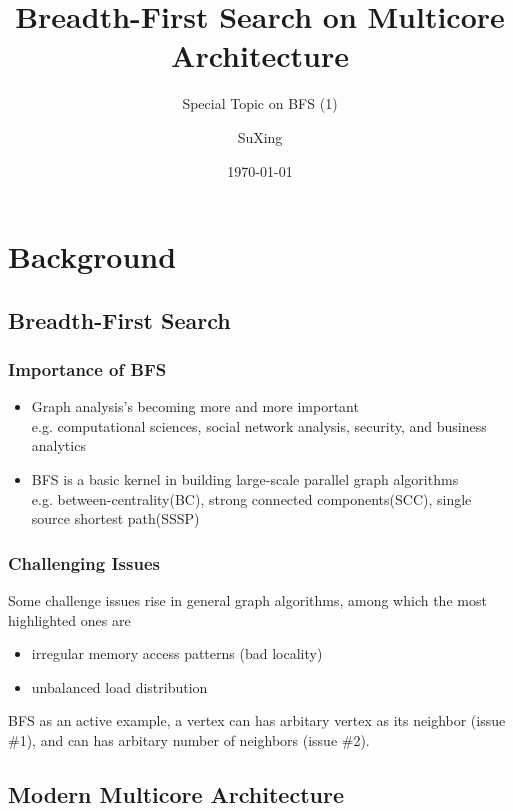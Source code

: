 \documentclass[]{beamer}
\title{Breadth-First Search on Multicore Architecture}
\subtitle{Special Topic on BFS (1)}
\author[SuXing~pysuxing@gmail.com]{SuXing}
\institute{TOW}
\date{\today}
\begin{document}
 
\setlength{\parindent}{0pt}

\frame{\titlepage}
\frame{\tableofcontents[hideallsubsections]}

\section{Background}
\frame{\tableofcontents[currentsection]}

\subsection{Breadth-First Search}

\begin{frame}
  \frametitle{Importance of BFS}
  \begin{itemize}
    \item Graph analysis's becoming more and more important\\
      e.g. computational sciences, social network analysis, security, and business analytics
    \item BFS is a basic kernel in building large-scale parallel graph algorithms\\
      e.g. between-centrality(BC), strong connected components(SCC), single source shortest path(SSSP)
  \end{itemize}
\end{frame}

\begin{frame}
  \frametitle{Challenging Issues}
  Some challenge issues rise in general graph algorithms, among which the most highlighted ones are
  \begin{itemize}
    \item irregular memory access patterns (bad locality)
    \item unbalanced load distribution
  \end{itemize}
  BFS as an active example, a vertex can has arbitary vertex as its neighbor (issue \#1), and can has
  arbitary number of neighbors (issue \#2).
\end{frame}

\subsection{Modern Multicore Architecture}
\end{document}

